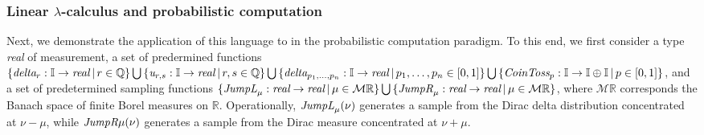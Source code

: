 \documentclass[10pt,a4paper]{amsart}
\theoremstyle{definition}
\theoremstyle{definition}
\theoremstyle{definition}
\theoremstyle{definition}
\theoremstyle{definition}
\theoremstyle{definition}
\begin{document}
\subsubsection{Linear $\lambda$-calculus and probabilistic computation} \label{subsec:syntax_pc}
Next, we demonstrate the application of this language to in the probabilistic computation paradigm. To this end, we first consider a type \emph{real} of measurement, a set of predermined functions 
$\{\emph{delta}_r: \mathbb{I} \to \emph{real} \hspace{2pt} \vert \, r \in \mathbb{Q} \} 
\bigcup \, \{ \emph{u}_{r,s}: \mathbb{I} \to \emph{real} \hspace{2pt} \vert \, r,s \in \mathbb{Q} \}
\bigcup \, \{ \emph{delta}_{p_1,\ldots,p_n}: \mathbb{I} \to \emph{real} \hspace{2pt} \vert \, p_1,\ldots,p_n  \in [0,1] \}  
\bigcup \, \{\emph{CoinToss}_p: \mathbb{I} \to \mathbb{I} \oplus \mathbb{I} \hspace{2pt} \vert \, p \in [0,1] \} $,  
and a set of predetermined sampling functions 
$ \{\emph{JumpL}_\mu: \emph{real}  \to \emph{real} \hspace{2pt} \vert \, \mu \in \mathcal{M}\mathbb{R} \} 
\bigcup \, \{\emph{JumpR}_\mu: \emph{real}  \to \emph{real} \hspace{2pt} \vert \, \mu \in \mathcal{M}\mathbb{R} \}$, where $\mathcal{M}\mathbb{R}$ corresponds the Banach space of finite Borel measures on $\mathbb{R}$.  Operationally, $\emph{JumpL}_\mu (\nu)$ generates a sample from the Dirac delta distribution concentrated at $\nu-\mu$, while $\emph{JumpR}\mu(\nu)$ generates a sample from the Dirac measure concentrated at $\nu + \mu$.
\end{document}
